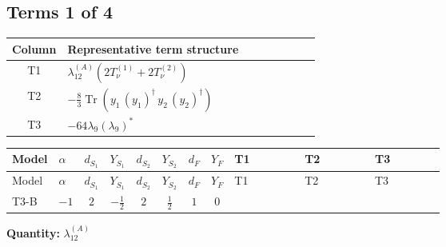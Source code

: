 \documentclass[8pt]{article}
\begin{document}
\begin{landscape}
\subsection*{Terms 1 of 4}
\begin{center}
\begin{tabular}{@{}c >{\raggedright\arraybackslash}p{0.82\linewidth}@{}}
\toprule
Column & Representative term structure \\
\midrule
T1 & \(\displaystyle {\lambda_{12}^{(A)}} (2 T_{\nu}^{(1)}+2 T_{\nu}^{(2)})\) \\
\midrule
T2 & \(\displaystyle -\frac{8}{3} \operatorname{Tr}\!\left({y_1}\,\left({y_1}\right)^{\dagger}\,{y_2}\,\left({y_2}\right)^{\dagger}\right)\) \\
\midrule
T3 & \(\displaystyle -64 {\lambda_{9}} \left({\lambda_{9}}\right)^{*}\) \\
\midrule
\bottomrule
\end{tabular}
\end{center}
\smallskip
\tiny
\begin{longtable}{@{}llcccccc >{\raggedright\arraybackslash}p{0.21\linewidth} >{\raggedright\arraybackslash}p{0.21\linewidth} >{\raggedright\arraybackslash}p{0.21\linewidth}@{}}
\toprule
Model & $\alpha$ & $d_{S_1}$ & $Y_{S_1}$ & $d_{S_2}$ & $Y_{S_2}$ & $d_F$ & $Y_F$ & T1 & T2 & T3 \\
\midrule
\endfirsthead
\toprule
Model & $\alpha$ & $d_{S_1}$ & $Y_{S_1}$ & $d_{S_2}$ & $Y_{S_2}$ & $d_F$ & $Y_F$ & T1 & T2 & T3 \\
\midrule
\endhead
T3-B & $-1$ & $2$ & $-\frac{1}{2}$ & $2$ & $\frac{1}{2}$ & $1$ & $0$ & \scriptsize\adjustbox{max width=\linewidth}{$\begin{gathered} {\lambda_{12}^{(A)}} (2 T_{\nu}^{(1)}+2 T_{\nu}^{(2)})\end{gathered}$} & \scriptsize\adjustbox{max width=\linewidth}{$\begin{gathered} -\frac{8}{3} \operatorname{Tr}\!\left({y_1}\,\left({y_1}\right)^{\dagger}\,{y_2}\,\left({y_2}\right)^{\dagger}\right)\end{gathered}$} & \scriptsize\adjustbox{max width=\linewidth}{$\begin{gathered} -64 {\lambda_{9}} \left({\lambda_{9}}\right)^{*}\end{gathered}$} \\
\midrule
\bottomrule
\end{longtable}
\clearpage
\noindent\textbf{Quantity: }$\lambda_{12}^{(A)}$\par\smallskip

\end{landscape}
\end{document}
